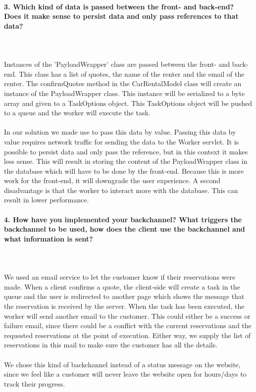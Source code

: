 \documentclass{ds-report}
\begin{document}
	\paragraph{3. Which kind of data is passed between the front- and back-end? Does it make sense to persist data and only pass references to that data?} \mbox{}\\\\
Instances of the 'PayloadWrapper' class are passed between the front- and back-end. This class has a list of quotes, the name of the renter and the email of the renter. The confirmQuotes method in the CarRentalModel class will create an instance of the PayloadWrapper class. This instance will be serialized to a byte array and given to a TaskOptions object. This TaskOptions object will be pushed to a queue and the worker will execute the task.\\\\
In our solution we made use to pass this data by value. Passing this data by value requires network traffic for sending the data to the Worker servlet. It is possible to persist data and only pass the reference, but in this context it makes less sense. This will result in storing the content of the PayloadWrapper class in the database which will have to be done by the front-end. Because this is more work for the front-end, it will downgrade the user experience. A second disadvantage is that the worker to interact more with the database. This can result in lower performance.
\clearpage



	\paragraph{4. How have you implemented your backchannel? What triggers the backchannel to be used, how does the client use the backchannel and what information is sent?} \mbox{}\\\\
We used an email service to let the customer know if their reservations were made. When a client confirms a quote, the client-side will create a task in the queue and the user is redirected to another page which shows the message that the reservation is received by the server. When the task has been executed, the worker will send another email to the customer. This could either be a success or failure email, since there could be a conflict with the current reservations and the requested reservations at the point of execution. Either way, we supply the list of reservations in this mail to make sure the customer has all the details.\mbox{}\\\\
We chose this kind of backchannel instead of a status message on the website, since we feel like a customer will never leave the website open for hours/days to track their progress.
\end{document}
